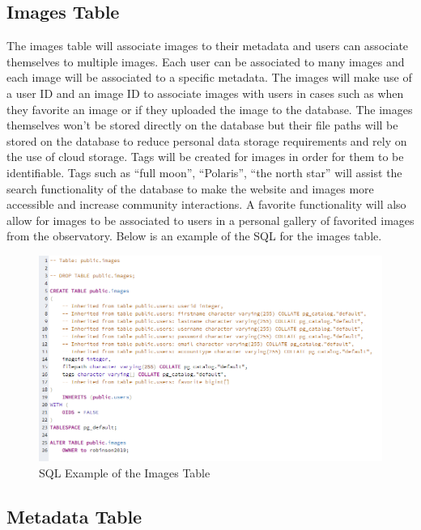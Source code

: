 \documentclass[12pt]{report}
\begin{document}
\subsection*{Images Table}

The images table will associate images to their metadata and users can associate themselves to multiple images.  Each user can be associated to many images and each image will be associated to a specific metadata.  The images will make use of a user ID and an image ID to associate images with users in cases such as when they favorite an image or if they uploaded the image to the database.  The images themselves won’t be stored directly on the database but their file paths will be stored on the database to reduce personal data storage requirements and rely on the use of cloud storage.  Tags will be created for images in order for them to be identifiable. Tags such as “full moon”, “Polaris”, “the north star” will assist the search functionality of the database to make the website and images more accessible and increase community interactions.  A favorite functionality will also allow for images to be associated to users in a personal gallery of favorited images from the observatory.  Below is an example of the SQL for the images table.

\begin{figure}[h]
	\centering
	\includegraphics[width=\linewidth]{database_images_table}
	\caption{SQL Example of the Images Table}
	\label{fig:SQL Images Table}
\end{figure}

\subsection{Metadata Table}
\end{document}
